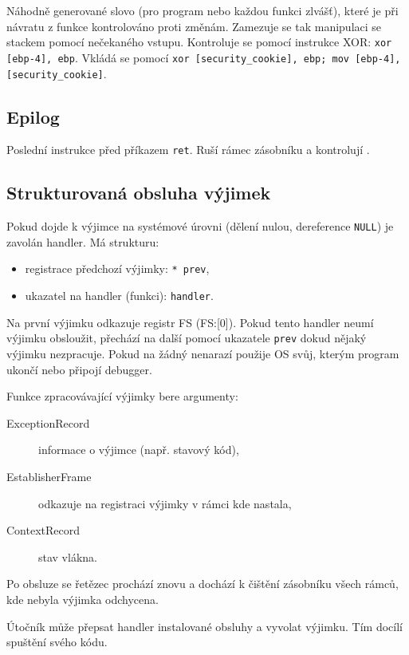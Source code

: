 Náhodně generované slovo (pro program nebo každou funkci zlvášť), které je při návratu z funkce kontrolováno proti změnám.
Zamezuje se tak manipulaci se stackem pomocí nečekaného vstupu.
Kontroluje se pomocí instrukce XOR: \texttt{xor [ebp-4], ebp}.
Vkládá se pomocí \texttt{xor [security\_cookie], ebp; mov [ebp-4], [security\_cookie]}.

\subsection*{Epilog}

Poslední instrukce před příkazem \texttt{ret}.
Ruší rámec zásobníku a kontrolují .

\subsection*{Strukturovaná obsluha výjimek}

Pokud dojde k výjimce na systémové úrovni (dělení nulou, dereference \texttt{NULL}) je zavolán handler.
Má strukturu:

\begin{itemize}
    \item registrace předchozí výjimky: \texttt{* prev},
    \item ukazatel na handler (funkci): \texttt{handler}.
\end{itemize}

Na první výjimku odkazuje registr FS (FS:[0]).
Pokud tento handler neumí výjimku obsloužit, přechází na další pomocí ukazatele \texttt{prev} dokud nějaký výjimku nezpracuje.
Pokud na žádný nenarazí použije OS svůj, kterým program ukončí nebo připojí debugger.


Funkce zpracovávající výjimky bere argumenty:

\begin{description}
    \item[ExceptionRecord] informace o výjimce (např. stavový kód),
    \item[EstablisherFrame] odkazuje na registraci výjimky v rámci kde nastala,
    \item[ContextRecord] stav vlákna.
\end{description}

Po obsluze se řetězec prochází znovu a dochází k čištění zásobníku všech rámců, kde nebyla výjimka odchycena.

Útočník může přepsat handler instalované obsluhy a vyvolat výjimku.
Tím docílí spuštění svého kódu.
